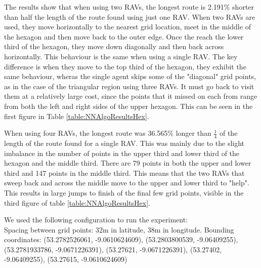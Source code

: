 The results show that when using two RAVs, the longest route is 2.191\% shorter than half the length of the route found using just one RAV. When two RAVs are used, they move horizontally to the nearest grid location, meet in the middle of the hexagon and then move back to the outer edge. Once the reach the lower third of the hexagon, they move down diagonally and then back across horizontally. This behaviour is the same when using a single RAV. The key difference is when they move to the top third of the hexagon, they exhibit the same behaviour, wheras the single agent skips some of the "diagonal" grid points, as in the case of the triangular region using three RAVs. It must go back to visit them at a relatively large cost, since the points that it missed on each from range from both the left and right sides of the upper hexagon. This can be seen in the first figure in Table \ref{table:NNAlgoResultsHex}.


When using four RAVs, the longest route was 36.565\% longer than $\frac{1}{4}$ of the length of the route found for a single RAV. This was mainly due to the slight imbalance in the number of points in the upper third and lower third of the hexagon and the middle third. There are 79 points in both the upper and lower third and 147 points in the middle third. This means that the two RAVs that sweep back and across the middle move to the upper and lower third to "help". This results in large jumps to finish of the final few grid points, visible in the third figure of table \ref{table:NNAlgoResultsHex}. 

We used the following configuration to run the experiment:
\\
Spacing between grid points: 32m in latitude, 38m in longitude.
Bounding coordinates: (53.2782526061, -9.0610624609), (53.2803800539, -9.06409255), (53.2781933786, -9.0671226391), (53.27621, -9.0671226391), (53.27402, -9.06409255), (53.27615, -9.0610624609)





